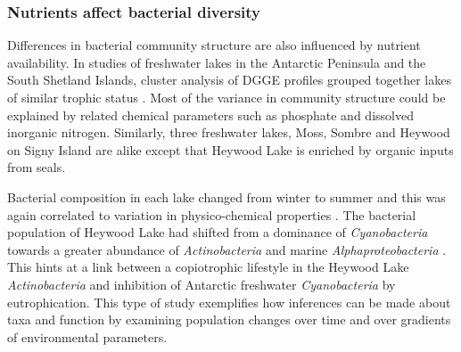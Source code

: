 \subsubsection{Nutrients affect bacterial diversity}
Differences in bacterial community structure are also influenced by nutrient availability.
In studies of freshwater lakes in the Antarctic Peninsula and the South Shetland Islands, cluster analysis of \ac{DGGE} profiles grouped together lakes of similar trophic status 
\cite{Schiaffino2009, Villaescusa2010}.
Most of the variance in community structure could be explained by related chemical parameters such as phosphate and dissolved inorganic nitrogen.
Similarly, three freshwater lakes, Moss, Sombre and Heywood on Signy Island are alike except that Heywood Lake is enriched by organic inputs from seals.

Bacterial composition in each lake changed from winter to summer and this was again correlated to variation in physico-chemical properties \cite{Pearce2005a}. 
The bacterial population of Heywood Lake had shifted from a dominance of \emph{Cyanobacteria} towards a greater abundance of \emph{Actinobacteria} and marine \emph{Alphaproteobacteria} \cite{Pearce2005b}.
This hints at a link between a copiotrophic lifestyle in the Heywood Lake \emph{Actinobacteria} and inhibition of Antarctic freshwater \emph{Cyanobacteria} by eutrophication. 
This type of study exemplifies how inferences can be made about taxa and function by examining population changes over time and over gradients of environmental parameters.

